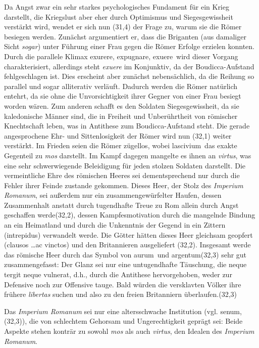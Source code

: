 \documentclass[12pt]{article}
\begin{document}
	Da Angst zwar ein sehr starkes psychologisches Fundament für ein Krieg darstellt, die Kriegslust aber eher durch Optimismus und Siegesgewissheit verstärkt wird, wendet er sich nun (31,4) der Frage zu, warum sie die Römer besiegen werden.
	Zunächst argumentiert er, dass die Briganten (aus damaliger Sicht \textit{sogar}) unter Führung einer Frau gegen die Römer Erfolge erzielen konnten. Durch die parallele Klimax \glqq exurere\grqq, \glqq expugnare\grqq, \glqq exuere\grqq\ wird dieser Vorgang charakterisiert, allerdings steht \textit{exuere} im Konjunktiv, da der Boudicca-Aufstand fehlgeschlagen ist. Dies erscheint aber zunächst nebensächlich, da die Reihung so parallel und sogar alliterativ verläuft. Dadurch werden die Römer natürlich entehrt, da sie ohne die Unvorsichtigkeit ihrer Gegner von einer Frau besiegt worden wären. Zum anderen schafft es den Soldaten Siegesgewissheit, da sie kaledonische Männer sind, die in Freiheit und Unberührtheit von römischer Knechtschaft leben, was in Antithese zum Boudicca-Aufstand steht.
	Die gerade angesprochene Ehr- und Sittenlosigkeit der Römer wird nun (32,1) weiter verstärkt. Im Frieden seien die Römer zügellos, wobei \glqq lascivium\grqq\ das exakte Gegenteil zu \textit{mos} darstellt. Im Kampf dagegen mangelte es ihnen an \textit{virtus}, was eine sehr schwerwiegende Beleidigung für jeden stolzen Soldaten darstellt.
	Die vermeintliche Ehre des römischen Heeres sei dementsprechend nur durch die Fehler ihrer Feinde zustande gekommen. Dieses Heer, der Stolz des \textit{Imperium Romanum}, sei außerdem nur ein zusammengewürfelter Haufen, dessen Zusammenhalt anstatt durch tugendhafte Treue zu Rom allein durch Angst geschaffen werde(32,2), dessen Kampfesmotivation durch die mangelnde Bindung an ein Heimatland und durch die Unkenntnis der Gegend in ein Zittern (\glqq intrepidus\grqq) verwandelt werde. Die Götter hätten dieses Heer gleichsam geopfert (\glqq clausos \dots ac vinctos\grqq) und den Britannieren ausgeliefert (32,2).
 	Insgesamt werde das römische Heer durch das Symbol von \glqq aurum\grqq\ und \glqq argentum\grqq(32,3) sehr gut zusammengefasst: Der Glanz sei nur eine untugendhafte Täuschung, die \glqq neque tergit neque vulnerat\grqq, d.h., durch die Antithese hervorgehoben, weder zur Defensive noch zur Offensive tauge. Bald würden die versklavten Völker ihre frühere \textit{libertas} suchen und also zu den freien Britanniern überlaufen.(32,3)
	
	Das \textit{Imperium Romanum} sei nur eine altersschwache Institution (vgl. senum, (32,3)), die von schlechtem Gehorsam und Ungerechtigkeit geprägt sei: Beide Aspekte stehen konträr zu sowohl \textit{mos} als auch \textit{virtus}, den Idealen des \textit{Imperium Romanum}.
	
\end{document}
